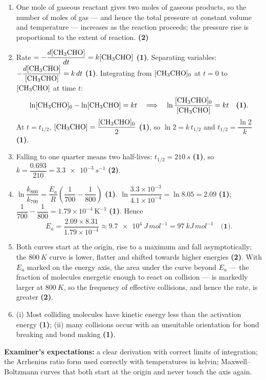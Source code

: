 \documentclass[11pt]{article}
\begin{document}
\begin{corrige}
\begin{enumerate}
\item One mole of gaseous reactant gives two moles of gaseous products, so the number of moles of gas — and hence the total pressure at constant volume and temperature — increases as the reaction proceeds; the pressure rise is proportional to the extent of reaction. \textbf{(2)}
\item Rate $= -\dfrac{d[\ce{CH3CHO}]}{dt} = k[\ce{CH3CHO}]$ \textbf{(1)}. Separating variables: $-\dfrac{d[\ce{CH3CHO}]}{[\ce{CH3CHO}]} = k\,dt$ \textbf{(1)}. Integrating from $[\ce{CH3CHO}]_0$ at $t = 0$ to $[\ce{CH3CHO}]$ at time $t$:
\[ \ln[\ce{CH3CHO}]_0 - \ln[\ce{CH3CHO}] = kt \quad\Longrightarrow\quad \ln\frac{[\ce{CH3CHO}]_0}{[\ce{CH3CHO}]} = kt \quad \textbf{(1)}. \]
At $t = t_{1/2}$, $[\ce{CH3CHO}] = \dfrac{[\ce{CH3CHO}]_0}{2}$ \textbf{(1)}, so $\ln 2 = k\,t_{1/2}$ and $t_{1/2} = \dfrac{\ln 2}{k}$ \textbf{(1)}.
\item Falling to one quarter means two half-lives: $t_{1/2} = \SI{210}{s}$ \textbf{(1)}, so $k = \dfrac{0.693}{210} = \SI{3.3e-3}{s^{-1}}$ \textbf{(2)}.
\item $\ln\dfrac{k_{800}}{k_{700}} = \dfrac{E_a}{R}\left(\dfrac{1}{700} - \dfrac{1}{800}\right)$ \textbf{(1)}. $\ln\dfrac{3.3\times 10^{-3}}{4.1\times 10^{-4}} = \ln 8.05 = 2.09$ \textbf{(1)}; $\dfrac{1}{700} - \dfrac{1}{800} = 1.79\times 10^{-4}\ \mathrm{K^{-1}}$ \textbf{(1)}. Hence
\[ E_a = \frac{2.09 \times 8.31}{1.79\times 10^{-4}} \approx \SI{9.7e4}{J\,mol^{-1}} = \SI{97}{kJ\,mol^{-1}} \quad \textbf{(1)}. \]
\item Both curves start at the origin, rise to a maximum and fall asymptotically; the $\SI{800}{K}$ curve is lower, flatter and shifted towards higher energies \textbf{(2)}. With $E_a$ marked on the energy axis, the area under the curve beyond $E_a$ — the fraction of molecules energetic enough to react on collision — is markedly larger at $\SI{800}{K}$, so the frequency of effective collisions, and hence the rate, is greater \textbf{(2)}.
\item (i) Most colliding molecules have kinetic energy less than the activation energy \textbf{(1)}; (ii) many collisions occur with an unsuitable orientation for bond breaking and bond making \textbf{(1)}.
\end{enumerate}
\textbf{Examiner's expectations:} a clear derivation with correct limits of integration; the Arrhenius ratio form used correctly with temperatures in kelvin; Maxwell--Boltzmann curves that both start at the origin and never touch the axis again.
\end{corrige}
\end{document}
